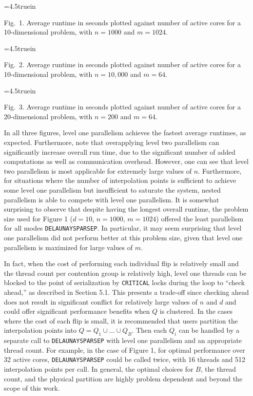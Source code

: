 \topinsert
\centerline{\epsfxsize=4.5truein }
{\narrower\noindent\rmVIII Fig.\ 1.
Average runtime in seconds plotted against number of active cores
for a 10-dimensional problem, with $n=1000$ and $m=1024$.
\par}
\endinsert

\midinsert
\centerline{\epsfxsize=4.5truein }
{\narrower\noindent\rmVIII Fig.\ 2.
Average runtime in seconds plotted against number of active cores
for a 10-dimensional problem, with $n=10,000$ and $m=64$.
\par}
\endinsert

\midinsert
\centerline{\epsfxsize=4.5truein }
{\narrower\noindent\rmVIII Fig.\ 3.
Average runtime in seconds plotted against number of active cores
for a 20-dimensional problem, with $n=200$ and $m=64$.
\par}
\endinsert

In all three figures, level one parallelism achieves the fastest average
runtimes, as expected. Furthermore, note that overapplying level two
parallelism can significantly increase overall run time, due to the
significant number of added computations as well as communication overhead.
However, one can see that level two parallelism is most applicable for
extremely large values of $n$. Furthermore, for situations where the
number of interpolation points is sufficient to achieve some level one
parallelism but insufficient to saturate the system,
nested parallelism is able to compete with level one parallelism.
It is somewhat surprising to observe that despite having the longest
overall runtime, the problem size used for Figure 1 ($d=10$, $n=1000$, 
$m=1024$) offered the least parallelism for all modes {\tt DELAUNAYSPARSEP}.
In particular, it may seem surprising that level one parallelism did not
perform better at this problem size, given that level one parallelism
is maximized for large values of $m$.

In fact, when the cost of performing each individual flip is relatively
small and the thread count per contention group is relatively high, level
one threads can be blocked to the point of serialization by {\tt CRITICAL}
locks during the loop to ``check ahead,'' as described in Section 5.1. This
presents a trade-off since checking ahead does not result in significant
conflict for relatively large values of $n$ and $d$ and could offer
significant performance benefits when $Q$ is clustered. In the cases
where the cost of each flip is small, it is recommended that users
partition the interpolation points into
$Q = Q_1 \cup \ldots \cup Q_B$. Then each $Q_i$ can be handled by a
separate call to {\tt DELAUNAYSPARSEP} with level one parallelism
and an appropriate thread count.
For example, in the case of Figure 1, for optimal performance over
32 active cores, {\tt DELAUNAYSPARSEP} could be called twice, with 16
threads and 512 interpolation points per call.
In general, the optimal choices for $B$, the thread count, and the
physical partition are highly problem dependent and beyond the scope
of this work.

